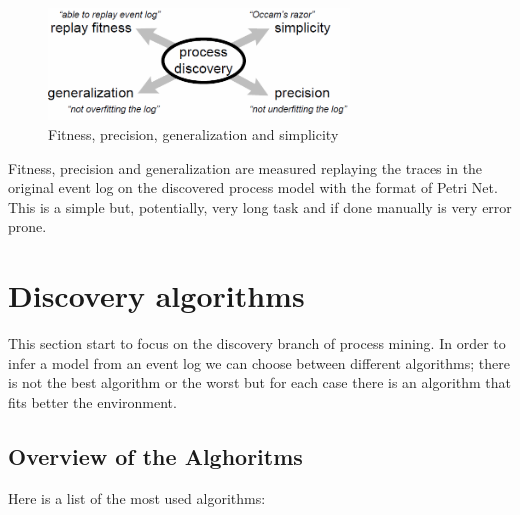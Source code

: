 \begin{figure}[!ht]
    \centering
\includegraphics[width=80mm]{images/model_quality.png}
    \caption{Fitness, precision, generalization and simplicity \cite{DBLP:conf/ReplayQualityParameters}}
    \label{images:model_quality}
\end{figure}

Fitness, precision and generalization are measured replaying the traces in the original event log on the discovered process 
model with the format of Petri Net. This is a simple but, potentially, very long task and if done manually is very error prone. 


\section{Discovery algorithms}
\label{process_mining:algorithms}
This section start to focus on the discovery branch of process mining. In order to infer a model from an event log 
we can choose between different algorithms; there is not the best algorithm or the worst but for each case there is an 
algorithm that fits better the environment.

\subsection{Overview of the Alghoritms}

Here is a list of the most used algorithms: 


